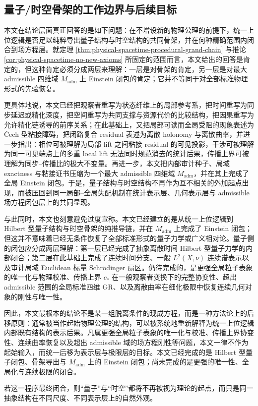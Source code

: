 \subsection{量子/时空骨架的工作边界与后续目标}\label{subsec:conclusion-quantum-spacetime-skeleton-boundary}

本文在结论层面真正回答的是如下问题：在不增设新的物理公理的前提下，统一上位逻辑是否足以纯粹导出量子结构与时空结构的共同骨架，并在何种精确范围内闭合到场方程层。就定理 \ref{thm:physical-spacetime-procedural-grand-chain} 与推论 \ref{cor:physical-spacetime-no-new-axioms} 所固定的范围而言，本文给出的回答是肯定的，但这种肯定必须分成两层来理解：一层是对骨架的肯定，另一层是对最大 admissible 四维域 \(M_{\mathrm{adm}}\) 上 Einstein 闭包的肯定；它并不等同于对全部标准物理形式的先验恢复。

更具体地说，本文已经把观察者重写为状态纤维上的局部参考系，把时间重写为同步延迟或精化深度，把空间重写为共同支撑与资源代价的比较结构，把因果重写为允许精化链诱导的前序关系；在此基础上，又把局部可读而全局受阻的现象表述为 \v{C}ech 型粘接障碍，把闭路复合 residual 表述为离散 holonomy 与离散曲率，并进一步指出：相位可被理解为局部 lift 之间粘接 residual 的可见投影，干涉可被理解为同一可见端点上的多重 local lift 无法同时规范消去的统计后果，传播上界可被理解为同步--传播比的极大不变量。再进一步，本文把内部审计种子、局域 exactness 与粘接证书压缩为一个最大 admissible 四维域 \(M_{\mathrm{adm}}\)，并在其上完成了全局 Einstein 闭包。于是，量子结构与时空结构不再作为互不相关的外加起点出现，而被压回到同一局部--全局失配机制在统计表示层、几何表示层与 admissible 场方程闭包层上的共同显现。

与此同时，本文也刻意避免过度宣称。本文已经建立的是从统一上位逻辑到 Hilbert 型量子结构与时空骨架的纯推导链，并在 \(M_{\mathrm{adm}}\) 上完成了 Einstein 闭包；但这并不意味着已经无条件恢复了全部标准形式的量子力学或广义相对论。量子侧的闭包应分成两层理解：第一层已经完成了抽象离散时间 Hilbert 型量子力学的内部闭合；第二层在此基础上完成了连续时间分支、一般 \(L^2(X,\nu)\) 连续谱表示以及审计局域 Euclidean 标量 Schr\"odinger 扇区。仍待完成的，是更强全局粒子表象的唯一化与物理校准、传播上界 \(c_*\) 在一般观察者变换下的完整协变性、超出 admissible 范围的全局标准四维 GR、以及离散曲率在细化极限中恢复连续几何对象的刚性与唯一性。

因此，本文最根本的结论不是某一组脱离条件的现成方程，而是一种方法论上的后移原则：通常被当作起始物理公理的结构，可以被系统地重新解释为统一上位逻辑内部既有结构的表示后果。凡属更强全局粒子表象的唯一化与校准、传播上界协变性、连续曲率恢复以及超出 admissible 域的场方程刚性等问题，本文一律不作为起始输入，而统一后移为表示层与极限层的目标。本文已经完成的是 Hilbert 型量子闭包、骨架导出与 \(M_{\mathrm{adm}}\) 上的 Einstein 闭包；尚未完成的是更强的唯一性、全局化与连续极限的闭合。

若这一程序最终闭合，则“量子”与“时空”都将不再被视为理论的起点，而只是同一抽象结构在不同尺度、不同表示层上的自然外观。
